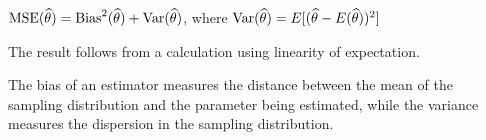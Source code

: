 \begin{thm}\label{BiasVarianceDecomp}$\index{Estimator!variance of}\text{MSE}(\widehat{\theta}) = \text{Bias}^2(\widehat{\theta}) + \Var(\widehat{\theta})$, where $\operatorname{Var}(\widehat{\theta}) = E[(\widehat{\theta} - E(\widehat{\theta}))^2]$ 
\end{thm}
\begin{pf} The result follows from a calculation using linearity of expectation.
\end{pf}
\par
The bias of an estimator measures the distance between the mean of the sampling distribution and the parameter being estimated, while the variance measures the dispersion in the sampling distribution.

